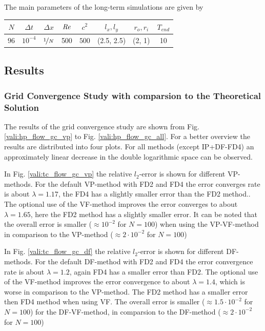 The main parameters of the long-term simulations are  given by

\begin{center}
\vspace*{0.7ex}
\begin{tabular}{c|c|c|c|c|c|c|c }
 $ N  $                   & $\Delta t$ & $\Delta x$            & $\mbox{\textit{Re}}$  & $c^2$   & $l_x, l_y$ &$r_o, r_i$ & $T_{end}$\\
\hline
 $96 $& $10^{-4}$ & $\nicefrac{1}{N}$ & 500     & $500$   & (2.5, 2.5)  & (2, 1)    & 10\\
\end{tabular}
\vspace*{0.7ex}
\end{center}

\clearpage

\subsection{Results}

\subsubsection{Grid Convergence Study with comparsion to the Theoretical Solution}


The results of the grid convergence study are shown from Fig. \ref{vali:hp_flow_gc_vp} to Fig. \ref{vali:hp_flow_gc_all}.
For a better overview the results are distributed into four plots.
For all methods (except IP+DF-FD4) an approximately linear decrease in the double logarithmic space can be observed.

In Fig. \ref{vali:tc_flow_gc_vp} the relative $l_2$-error is shown for different VP-methods.
For the default VP-method with FD2 and FD4 the error converges rate is about $\lambda=1.17$,
the FD4 has a slightly smaller error than the FD2 method..
The optional use of the VF-method improves the error converges to about $\lambda=1.65$,
here the FD2 method has a slightly smaller error.
It can be noted that the overall error is smaller ($\approx 10^{-2}$ for $N=100$)
when using the VP-VF-method in comparison to the VP-method ($\approx2\cdot 10^{-2}$ for $N=100$)

In Fig. \ref{vali:tc_flow_gc_df} the relative $l_2$-error is shown for different DF-methods.
For the default DF-method with FD2 and FD4 the error convergence rate is about $\lambda=1.2$,
again FD4 has a smaller error than FD2.
The optional use of the VF-method improves the error convergence to about $\lambda=1.4$,
which is worse in comparison to the VP-method. The FD2 method has a smaller error then FD4 method when using VF.
The overall error is smaller ($\approx 1.5 \cdot 10^{-2}$ for $N=100$) for the DF-VF-method,
in comparsion to the DF-method ($\approx2\cdot 10^{-2}$ for $N=100$)

